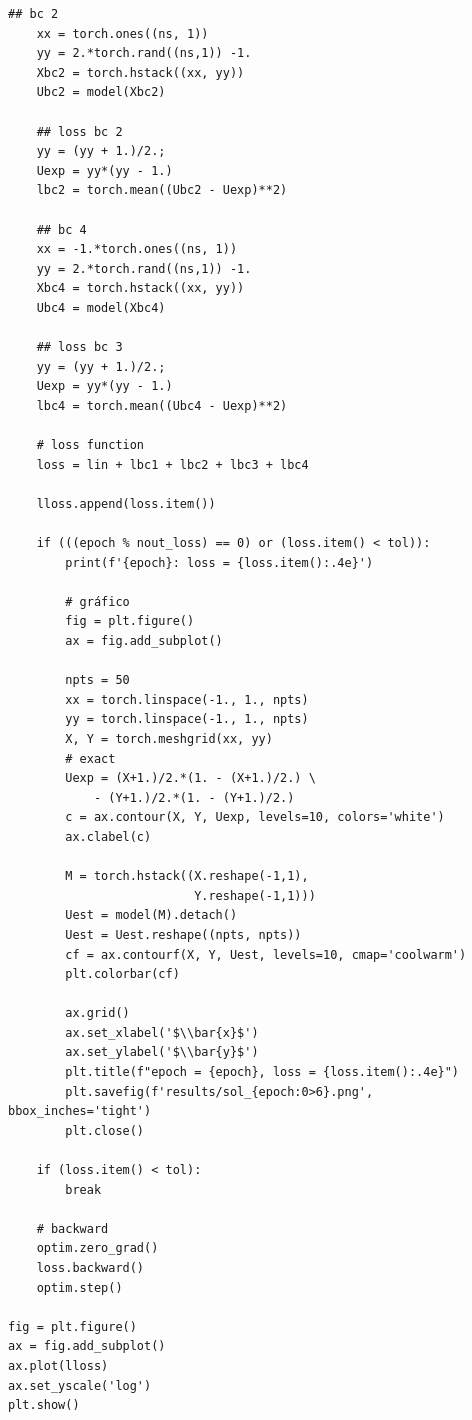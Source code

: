 \begin{ex}
\begin{lstlisting}[caption=pyEqLaplacePP]
    ## bc 2
    xx = torch.ones((ns, 1))
    yy = 2.*torch.rand((ns,1)) -1.
    Xbc2 = torch.hstack((xx, yy))
    Ubc2 = model(Xbc2)

    ## loss bc 2
    yy = (yy + 1.)/2.;
    Uexp = yy*(yy - 1.)
    lbc2 = torch.mean((Ubc2 - Uexp)**2)

    ## bc 4
    xx = -1.*torch.ones((ns, 1))
    yy = 2.*torch.rand((ns,1)) -1.
    Xbc4 = torch.hstack((xx, yy))
    Ubc4 = model(Xbc4)

    ## loss bc 3
    yy = (yy + 1.)/2.;
    Uexp = yy*(yy - 1.)
    lbc4 = torch.mean((Ubc4 - Uexp)**2)

    # loss function
    loss = lin + lbc1 + lbc2 + lbc3 + lbc4

    lloss.append(loss.item())

    if (((epoch % nout_loss) == 0) or (loss.item() < tol)):
        print(f'{epoch}: loss = {loss.item():.4e}')
    
        # gráfico
        fig = plt.figure()
        ax = fig.add_subplot()

        npts = 50
        xx = torch.linspace(-1., 1., npts)
        yy = torch.linspace(-1., 1., npts)
        X, Y = torch.meshgrid(xx, yy)
        # exact
        Uexp = (X+1.)/2.*(1. - (X+1.)/2.) \
            - (Y+1.)/2.*(1. - (Y+1.)/2.)
        c = ax.contour(X, Y, Uexp, levels=10, colors='white')
        ax.clabel(c)

        M = torch.hstack((X.reshape(-1,1),
                          Y.reshape(-1,1)))
        Uest = model(M).detach()
        Uest = Uest.reshape((npts, npts))
        cf = ax.contourf(X, Y, Uest, levels=10, cmap='coolwarm')
        plt.colorbar(cf)
        
        ax.grid()
        ax.set_xlabel('$\\bar{x}$')
        ax.set_ylabel('$\\bar{y}$')
        plt.title(f"epoch = {epoch}, loss = {loss.item():.4e}")
        plt.savefig(f'results/sol_{epoch:0>6}.png', bbox_inches='tight')
        plt.close()

    if (loss.item() < tol):
        break

    # backward
    optim.zero_grad()
    loss.backward()
    optim.step()

fig = plt.figure()
ax = fig.add_subplot()
ax.plot(lloss)
ax.set_yscale('log')
plt.show()
\end{lstlisting}
\end{ex}


